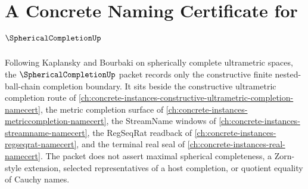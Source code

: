 \chapter{A Concrete Naming Certificate for $\SphericalCompletionUp$}
\label{ch:concrete-instances-spherical-completion-namecert}

Following Kaplansky and Bourbaki on spherically complete ultrametric spaces, the $\SphericalCompletionUp$ packet records only the constructive finite nested-ball-chain completion boundary. It sits beside the constructive ultrametric completion route of \autoref{ch:concrete-instances-constructive-ultrametric-completion-namecert}, the metric completion surface of \autoref{ch:concrete-instances-metriccompletion-namecert}, the StreamName windows of \autoref{ch:concrete-instances-streamname-namecert}, the RegSeqRat readback of \autoref{ch:concrete-instances-regseqrat-namecert}, and the terminal real seal of \autoref{ch:concrete-instances-real-namecert}. The packet does not assert maximal spherical completeness, a Zorn-style extension, selected representatives of a host completion, or quotient equality of Cauchy names.

